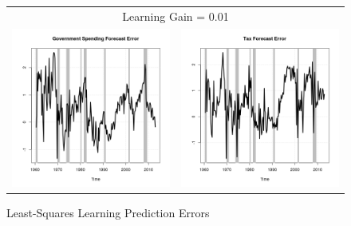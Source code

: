 \documentclass[11pt]{article}
\begin{document}
\begin{figure}\caption{Least-Squares Learning Prediction Errors}\label{fg:fe0.01}
\begin{center}
\begin{tabular}{cc}
\multicolumn{2}{c}{Learning Gain = 0.01} \\ [0.5pc]
\includegraphics[scale=0.45]{./results/pics0.01/fe_gov.png} & \includegraphics[scale=0.45]{./results/pics0.01/fe_tax.png} \\

\end{tabular}
\end{center}
\end{figure}
\end{document}
